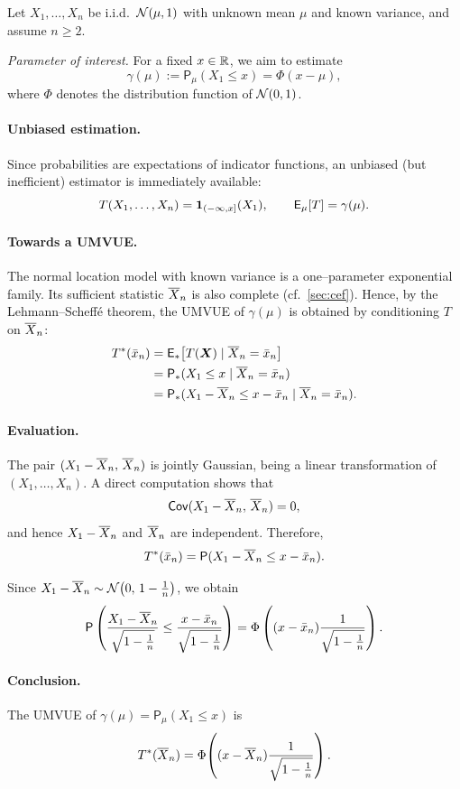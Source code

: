 \begin{ex}
Let \(X_{1},\dots,X_{n}\) be i.i.d.\ \(\mathcal{N}(\mu,1)\) with unknown mean \(\mu\) and known variance, and assume \(n\ge2\).

\emph{Parameter of interest.}
For a fixed \(x\in\mathbb{R}\), we aim to estimate
\[
\gamma(\mu)
:= \mathsf{P}_{\mu}(X_{1}\le x)
= \Phi(x-\mu),
\]
where \(\Phi\) denotes the distribution function of \(\mathcal{N}(0,1)\).

\paragraph{Unbiased estimation.}
Since probabilities are expectations of indicator functions, an unbiased (but inefficient) estimator is immediately available:
\[
T(X_{1},\dots,X_{n})
= \boldsymbol{1}_{(-\infty,x]}(X_{1}),
\qquad
\mathsf{E}_{\mu}[T] = \gamma(\mu).
\]

\paragraph{Towards a UMVUE.}
The normal location model with known variance is a one--parameter exponential family.
Its sufficient statistic \(\overline{X}_{n}\) is also complete (cf.\ \autoref{sec:cef}).
Hence, by the Lehmann--Scheff\'e theorem, the UMVUE of \(\gamma(\mu)\) is obtained by conditioning \(T\) on \(\overline{X}_{n}\):
\begin{align*}
T^{*}(\bar{x}_{n})
&= \mathsf{E}_{*}\!\left[T(\boldsymbol{X}) \mid \overline{X}_{n}=\bar{x}_{n}\right] \\
&= \mathsf{P}_{*}(X_{1}\le x \mid \overline{X}_{n}=\bar{x}_{n}) \\
&= \mathsf{P}_{*}(X_{1}-\overline{X}_{n} \le x-\bar{x}_{n} \mid \overline{X}_{n}=\bar{x}_{n}).
\end{align*}

\paragraph{Evaluation.}
The pair \((X_{1}-\overline{X}_{n},\,\overline{X}_{n})\) is jointly Gaussian, being a linear transformation of \((X_{1},\dots,X_{n})\).
A direct computation shows that
\[
\mathsf{Cov}(X_{1}-\overline{X}_{n},\,\overline{X}_{n}) = 0,
\]
and hence \(X_{1}-\overline{X}_{n}\) and \(\overline{X}_{n}\) are independent.
Therefore,
\[
T^{*}(\bar{x}_{n})
= \mathsf{P}(X_{1}-\overline{X}_{n} \le x-\bar{x}_{n}).
\]

Since \(X_{1}-\overline{X}_{n} \sim \mathcal{N}\!\left(0,\,1-\frac{1}{n}\right)\), we obtain
    \[
        \mathsf{P}\left( \frac{X_1-\overline{X}_{n}}{\sqrt{1-\frac{1}{n}} }\le \frac{x-\bar{x}_{n}}{\sqrt{1-\frac{1}{n}} } \right) 
        = \Phi \left( (x-\bar{x}_{n}) \frac{1}{\sqrt{1-\frac{1}{n}} } \right).
    \]
\paragraph{Conclusion.}
The UMVUE of \(\gamma(\mu)=\mathsf{P}_{\mu}(X_{1}\le x)\) is
\[
T^{*}(\overline{X}_{n})
= \Phi\!\left( (x-\overline{X}_{n}) \frac{1}{\sqrt{1-\frac{1}{n}}} \right).
\]
\end{ex}

